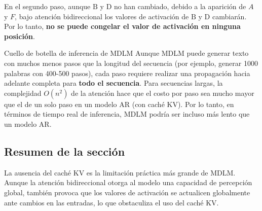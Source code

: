 En el segundo paso, aunque $\text{B}$ y $\text{D}$ no han cambiado, debido a la aparición de $A$ y $F$, bajo atención bidireccional los valores de activación de $\text{B}$ y $\text{D}$ cambiarán. Por lo tanto, \textbf{no se puede congelar el valor de activación en ninguna posición}.

\begin{warningbox}{Cuello de botella de inferencia de MDLM}
Aunque MDLM puede generar texto con muchos menos pasos que la longitud del secuencia (por ejemplo, generar 1000 palabras con 400-500 pasos), cada paso requiere realizar una propagación hacia adelante completa para \textbf{todo el secuencia}. Para secuencias largas, la complejidad $O(n^2)$ de la atención hace que el costo por paso sea mucho mayor que el de un solo paso en un modelo AR (con caché KV). Por lo tanto, en términos de tiempo real de inferencia, MDLM podría ser incluso más lento que un modelo AR.
\end{warningbox}

\subsection{Resumen de la sección}

La ausencia del caché KV es la limitación práctica más grande de MDLM. Aunque la atención bidireccional otorga al modelo una capacidad de percepción global, también provoca que los valores de activación se actualicen globalmente ante cambios en las entradas, lo que obstaculiza el uso del caché KV.

\newpage
